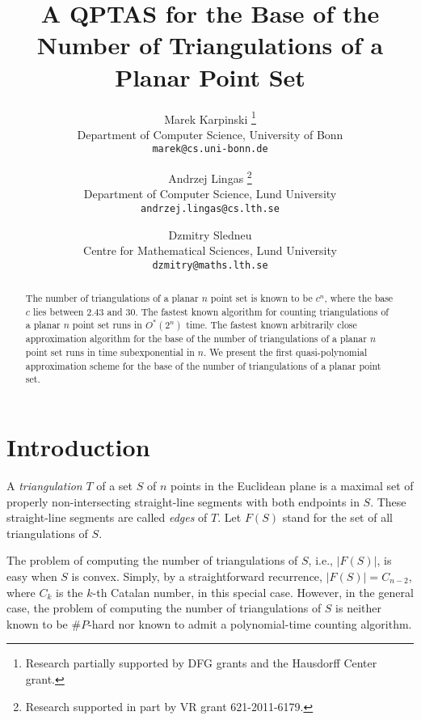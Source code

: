 \documentclass[a4paper]{article}
\begin{document}
\title{A QPTAS for the Base of the Number 
of Triangulations of a Planar Point Set}

\author{
Marek Karpinski
\thanks{Research partially supported by DFG grants and the Hausdorff Center grant.}\\
Department of Computer Science, University of Bonn\\
\texttt{marek@cs.uni-bonn.de}
\and
Andrzej Lingas
\thanks{Research supported in part by VR grant 621-2011-6179.}\\
Department of Computer Science, Lund University\\
\texttt{andrzej.lingas@cs.lth.se}
\and
Dzmitry Sledneu\\
Centre for Mathematical Sciences, Lund University\\
\texttt{dzmitry@maths.lth.se}
}

\maketitle

\begin{abstract}
The number of triangulations of a planar $n$ point
set is known to be $c^n$, where the base $c$
lies between $2.43$ and $30$.
The fastest known algorithm for counting triangulations
of a planar $n$ point set runs in $O^*(2^n)$ time. 
The fastest known arbitrarily close approximation
algorithm for the base of the
number of triangulations of a planar $n$ point set
runs in time subexponential in $n$.
We present the first quasi-polynomial
approximation scheme for the base of the number
of triangulations of a planar point set.
\end{abstract}

\section{Introduction}

A \emph{triangulation}  $T$ of a set $S$ of $n$ points
in the Euclidean plane is a maximal set of
properly non-intersecting straight-line segments
with both endpoints in $S$. These straight-line segments
are called \emph{edges} of $T$.
Let $F(S)$ stand for the set of all triangulations
of $S$. 

The problem of computing the number of triangulations
of $S$, i.e., $|F(S)|$, is easy when $S$ is convex.
Simply, by a straightforward recurrence, 
$|F(S)|=C_{n-2}$, where $C_k$ is the $k$-th Catalan
number, in this special case. However, in the general
case, the problem of computing the number
of triangulations of $S$ is neither known to
be $\# P$-hard nor known to admit a polynomial-time counting algorithm.
\end{document}

